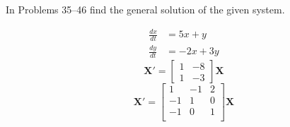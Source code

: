 \documentclass[chapter=8,section=2]{math252homework}
\begin{document}
In Problems 35--46 find the general solution of the given system.
\begin{problems}[start=37]
	\problem \begin{equation*}
	\begin{aligned}
		\frac{dx}{dt} &= 5x + y\\
		\frac{dy}{dt} &= -2x + 3y
	\end{aligned}
	\end{equation*}			%
	\setcounter{problemsi}{39}
	\problem \[ \mathbf{X'} = \left[ \begin{array}{cc}
		1 & -8\\ 1 & -3 \end{array} \right]\mathbf{X} \]			%
	\setcounter{problemsi}{42}
	\problem \[ \mathbf{X'} = \left[ \begin{array}{rrr}
		1 & -1 & 2\\
		-1 & 1 & 0\\
		-1 & 0 & 1\\
	\end{array} \right]\mathbf{X} \]			%
\end{problems}
\end{document}
